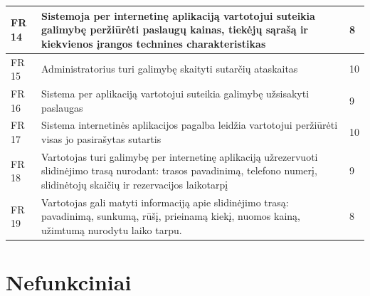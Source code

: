 \documentclass[oneside]{VUMIFPSkursinis}
\begin{document}
\begin{longtable}{ | p{}|p{}|p{}| }
	FR 14 & Sistemoja per internetinę aplikaciją vartotojui suteikia galimybę peržiūrėti paslaugų kainas, tiekėjų sąrašą ir kiekvienos įrangos technines charakteristikas & 8 \\ \hline
	FR 15 & Administratorius turi galimybę skaityti sutarčių ataskaitas & 10\\ \hline
	FR 16 & Sistema per aplikaciją vartotojui suteikia galimybę užsisakyti paslaugas &  9\\ \hline
	FR 17 & Sistema internetinės aplikacijos pagalba leidžia vartotojui peržiūrėti visas jo pasirašytas sutartis & 10 \\ \hline
	FR 18 &  Vartotojas turi galimybę per internetinę aplikaciją užrezervuoti slidinėjimo trasą nurodant: trasos pavadinimą, telefono numerį, slidinėtojų skaičių ir rezervacijos laikotarpį  & 9 \\ \hline
	FR 19 &  Vartotojas gali matyti informaciją apie slidinėjimo trasą: pavadinimą, sunkumą, rūšį, prieinamą kiekį, nuomos kainą, užimtumą nurodytu laiko tarpu. & 8 \\ \hline
	\end{longtable}

 
\section{Nefunkciniai}
\end{document}
